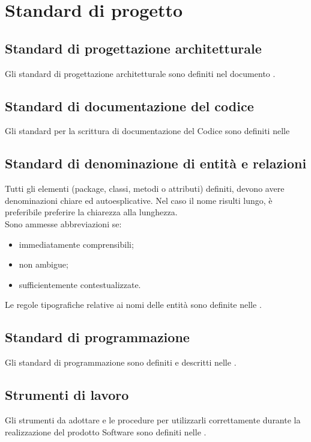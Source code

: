 \section{Standard di progetto}{
	\subsection{Standard di progettazione architetturale}{
		Gli standard di progettazione architetturale sono definiti nel documento \href{run:../../Esterni/\fSpecificaTecnica}{\fEscapeSpecificaTecnica}.}
	\subsection{Standard di documentazione del codice}{
		Gli standard per la scrittura di documentazione del Codice sono definiti nelle \href{run:../../Interni/\fNormeDiProgetto}{\fEscapeNormeDiProgetto}}
	\subsection{Standard di denominazione di entità e relazioni}{
		Tutti gli elementi (package, classi, metodi o attributi) definiti, devono avere denominazioni chiare ed autoesplicative. Nel caso il nome risulti lungo, è preferibile preferire la chiarezza alla lunghezza. \\
		Sono ammesse abbreviazioni se:
		\begin{itemize}
			\item immediatamente comprensibili;
			\item non ambigue;
			\item sufficientemente contestualizzate.
		\end{itemize}
		Le regole tipografiche relative ai nomi delle entità sono definite nelle \href{run:../../Interni/\fNormeDiProgetto}{\fEscapeNormeDiProgetto}.}
	\subsection{Standard di programmazione}{
		Gli standard di programmazione sono definiti e descritti nelle \href{run:../../Interni/\fNormeDiProgetto}{\fEscapeNormeDiProgetto}.}
	\subsection{Strumenti di lavoro}{
		Gli strumenti da adottare e le procedure per utilizzarli correttamente durante la realizzazione del prodotto Software sono definiti nelle \href{run:../../Interni/\fNormeDiProgetto}{\fEscapeNormeDiProgetto}.}
}